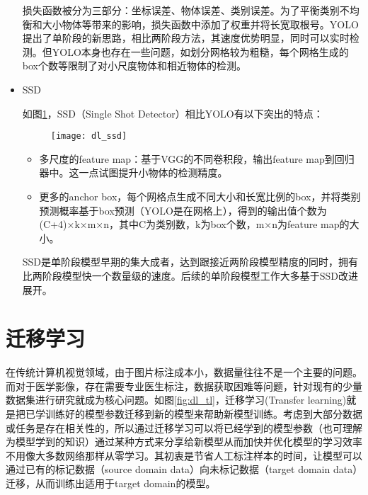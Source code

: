 \begin{itemize}
损失函数被分为三部分：坐标误差、物体误差、类别误差。为了平衡类别不均衡和大小物体等带来的影响，损失函数中添加了权重并将长宽取根号。YOLO提出了单阶段的新思路，相比两阶段方法，其速度优势明显，同时可以实时检测。但YOLO本身也存在一些问题，如划分网格较为粗糙，每个网格生成的box个数等限制了对小尺度物体和相近物体的检测。

	\item SSD\cite{37Liu2016SSD}
	
	如图\ref{fig:dl_ssd}，SSD（Single Shot Detector）相比YOLO有以下突出的特点：
		\begin{figure}[!htbp]
    \centering
    \texttt{[image: dl\_ssd]}
    \label{fig:dl_ssd}
	\end{figure}
	\begin{itemize}
		\item 多尺度的feature map：基于VGG的不同卷积段，输出feature map到回归器中。这一点试图提升小物体的检测精度。
		\item 更多的anchor box，每个网格点生成不同大小和长宽比例的box，并将类别预测概率基于box预测（YOLO是在网格上），得到的输出值个数为(C+4)×k×m×n，其中C为类别数，k为box个数，m×n为feature map的大小。
		
	\end{itemize}
	
	SSD是单阶段模型早期的集大成者，达到跟接近两阶段模型精度的同时，拥有比两阶段模型快一个数量级的速度。后续的单阶段模型工作大多基于SSD改进展开。	
\end{itemize}
\section{迁移学习}

在传统计算机视觉领域，由于图片标注成本小，数据量往往不是一个主要的问题。而对于医学影像，存在需要专业医生标注，数据获取困难等问题，针对现有的少量数据集进行研究就成为核心问题。如图\ref{fig:dl_tl}，迁移学习(Transfer learning)\cite{63pan2010survey}就是把已学训练好的模型参数迁移到新的模型来帮助新模型训练。考虑到大部分数据或任务是存在相关性的，所以通过迁移学习可以将已经学到的模型参数（也可理解为模型学到的知识）通过某种方式来分享给新模型从而加快并优化模型的学习效率不用像大多数网络那样从零学习。其初衷是节省人工标注样本的时间，让模型可以通过已有的标记数据（source domain data）向未标记数据（target domain data）迁移，从而训练出适用于target domain的模型。

